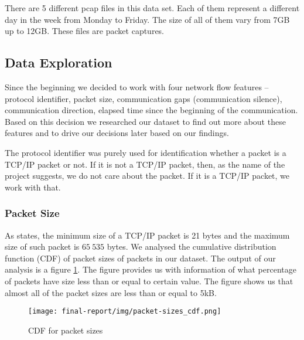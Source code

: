 \documentclass{article}
\begin{document}
There are 5 different pcap files in this data set. Each of them represent a different day in the week from Monday to Friday. The size of all of them vary from 7GB up to 12GB. These files are packet captures.


\subsection{Data Exploration}\label{sec-dataset-exploration}
Since the beginning we decided to work with four network flow features -- protocol identifier, packet size, communication gaps (communication silence), communication direction, elapsed time since the beginning of the communication. Based on this decision we researched our dataset to find out more about these features and to drive our decisions later based on our findings.

The protocol identifier was purely used for identification whether a packet is a TCP/IP packet or not. If it is not a TCP/IP packet, then, as the name of the project suggests, we do not care about the packet. If it is a TCP/IP packet, we work with that.

\subsubsection{Packet Size}
As \cite{oreilly-tcp} states, the minimum size of a TCP/IP packet is 21 bytes and the maximum size of such packet is $65\ 535$ bytes. We analysed the cumulative distribution function (CDF) of packet sizes of packets in our dataset. The output of our analysis is a figure \ref{fig-cdf-packet-sizes}. The figure provides us with information of what percentage of packets have size less than or equal to certain value. The figure shows us that almost all of the packet sizes are less than or equal to 5kB.

\begin{figure}[h!]
    \centering
    \texttt{[image: final-report/img/packet-sizes\_cdf.png]}
    \caption{CDF for packet sizes}
    \label{fig-cdf-packet-sizes}
\end{figure}
\end{document}
